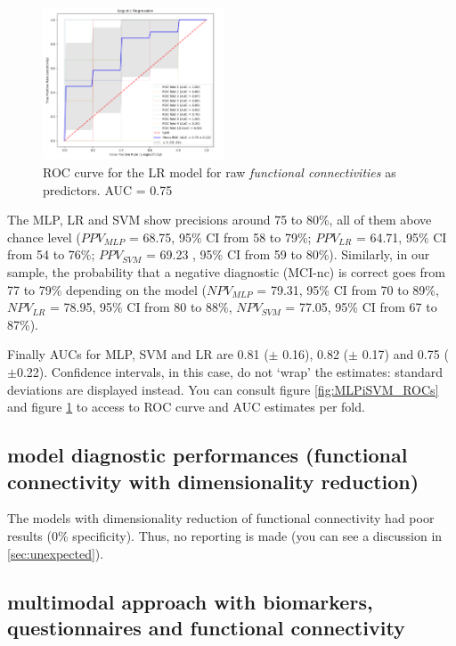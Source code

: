 \documentclass[a4paper,12pt]{elsarticle}  %
\begin{document}
			\begin{figure}
				\begin{center}
					\includegraphics[width=0.48\textwidth]{fig_LR_fMRI_nodimreduc_ROC.png}
				\end{center}
				\caption{ROC curve for the LR model for raw \textit{functional connectivities} as predictors. AUC = 0.75}
				\label{fig:LR_ROC}
			\end{figure}

The MLP, LR and SVM show precisions around 75 to 80\%, all of them above chance level ($PPV_{MLP}$ = 68.75, 95\% CI from 58 to 79\%; $PPV_{LR}$ = 64.71, 95\% CI from 54 to 76\%; $PPV_{SVM}$ = 69.23 , 95\% CI from 59 to 80\%). Similarly, in our sample, the probability that a negative diagnostic (MCI-nc) is correct goes from 77 to 79\% depending on the model ($NPV_{MLP}$ = 79.31, 95\% CI from 70 to 89\%, $NPV_{LR}$ = 78.95, 95\% CI from 80 to 88\%, $NPV_{SVM}$ = 77.05, 95\% CI from 67 to 87\%).		
	\FloatBarrier

	
\hfill \hfill \break \break Finally AUCs for MLP, SVM and LR are 0.81 ($\pm$ 0.16), 0.82 ($\pm$ 0.17) and 0.75 ($\pm$0.22). Confidence intervals, in this case, do not `wrap' the estimates: standard deviations are displayed instead. You can consult figure \ref{fig:MLPiSVM_ROCs} and figure \ref{fig:LR_ROC} to access to ROC curve and AUC estimates per fold.


		\subsection{model diagnostic performances (functional connectivity with dimensionality reduction)}
		
		The models with dimensionality reduction of functional connectivity had poor results (0\% specificity). Thus, no reporting is made (you can see a discussion in \ref{sec:unexpected}).
		
		\subsection{multimodal approach with biomarkers, questionnaires and functional connectivity}
	
\end{document}

